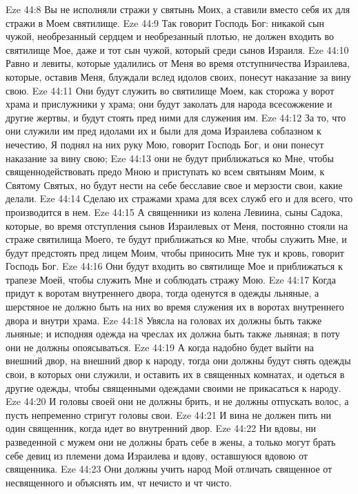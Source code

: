 \vs Eze 44:8 Вы не исполняли стражи у святынь Моих, а ставили вместо себя их для стражи в Моем святилище.
\vs Eze 44:9 Так говорит Господь Бог: никакой сын чужой, необрезанный сердцем и необрезанный плотью, не должен входить во святилище Мое, даже и тот сын чужой, который  среди сынов Израиля.
\vs Eze 44:10 Равно и левиты, которые удалились от Меня во время отступничества Израилева, которые, оставив Меня, блуждали вслед идолов своих, понесут наказание за вину свою.
\vs Eze 44:11 Они будут служить во святилище Моем, как сторожа у ворот храма и прислужники у храма; они будут заколать для народа всесожжение и другие жертвы, и будут стоять пред ними для служения им.
\vs Eze 44:12 За то, что они служили им пред идолами их и были для дома Израилева соблазном к нечестию, Я поднял на них руку Мою, говорит Господь Бог, и они понесут наказание за вину свою;
\vs Eze 44:13 они не будут приближаться ко Мне, чтобы священнодействовать предо Мною и приступать ко всем святыням Моим, к Святому Святых, но будут нести на себе бесславие свое и мерзости свои, какие делали.
\vs Eze 44:14 Сделаю их стражами храма для всех служб его и для всего, что производится в нем.
\vs Eze 44:15 А священники из колена Левиина, сыны Садока, которые, во время отступления сынов Израилевых от Меня, постоянно стояли на страже святилища Моего, те будут приближаться ко Мне, чтобы служить Мне, и будут предстоять пред лицем Моим, чтобы приносить Мне тук и кровь, говорит Господь Бог.
\vs Eze 44:16 Они будут входить во святилище Мое и приближаться к трапезе Моей, чтобы служить Мне и соблюдать стражу Мою.
\vs Eze 44:17 Когда придут к воротам внутреннего двора, тогда оденутся в одежды льняные, а шерстяное не должно быть на них во время служения их в воротах внутреннего двора и внутри храма.
\vs Eze 44:18 Увясла на головах их должны быть также льняные; и исподняя одежда на чреслах их должна быть также льняная; в поту они не должны опоясываться.
\vs Eze 44:19 А когда надобно будет выйти на внешний двор, на внешний двор к народу, тогда они должны будут снять одежды свои, в которых они служили, и оставить их в священных комнатах, и одеться в другие одежды, чтобы священными одеждами своими не прикасаться к народу.
\vs Eze 44:20 И головы своей они не должны брить, и не должны отпускать волос, а пусть непременно стригут головы свои.
\vs Eze 44:21 И вина не должен пить ни один священник, когда идет во внутренний двор.
\vs Eze 44:22 Ни вдовы, ни разведенной с мужем они не должны брать себе в жены, а только могут брать себе девиц из племени дома Израилева и вдову, оставшуюся вдовою от священника.
\vs Eze 44:23 Они должны учить народ Мой отличать священное от несвященного и объяснять им, чт нечисто и чт чисто.
